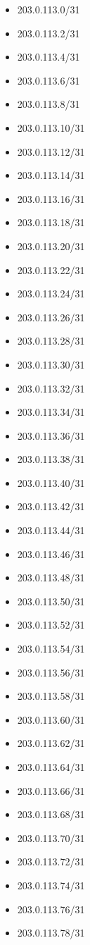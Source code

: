 \documentclass[a4paper,10pt]{article}
\begin{document}
\begin{itemize}
  \item 203.0.113.0/31
  \item 203.0.113.2/31
  \item 203.0.113.4/31
  \item 203.0.113.6/31
  \item 203.0.113.8/31
  \item 203.0.113.10/31
  \item 203.0.113.12/31
  \item 203.0.113.14/31
  \item 203.0.113.16/31
  \item 203.0.113.18/31
  \item 203.0.113.20/31
  \item 203.0.113.22/31
  \item 203.0.113.24/31
  \item 203.0.113.26/31
  \item 203.0.113.28/31
  \item 203.0.113.30/31
  \item 203.0.113.32/31
  \item 203.0.113.34/31
  \item 203.0.113.36/31
  \item 203.0.113.38/31
  \item 203.0.113.40/31
  \item 203.0.113.42/31
  \item 203.0.113.44/31
  \item 203.0.113.46/31
  \item 203.0.113.48/31
  \item 203.0.113.50/31
  \item 203.0.113.52/31
  \item 203.0.113.54/31
  \item 203.0.113.56/31
  \item 203.0.113.58/31
  \item 203.0.113.60/31
  \item 203.0.113.62/31
  \item 203.0.113.64/31
  \item 203.0.113.66/31
  \item 203.0.113.68/31
  \item 203.0.113.70/31
  \item 203.0.113.72/31
  \item 203.0.113.74/31
  \item 203.0.113.76/31
  \item 203.0.113.78/31

\end{itemize}
\end{document}
